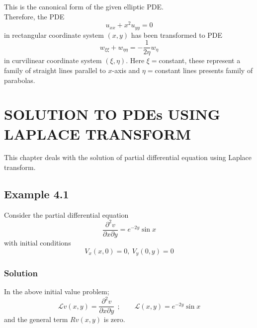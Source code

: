 \documentclass[11pt]{report}
\newcommand{\Laplace}{\mathcal{L}}
\newcommand{\sps}{\\[0.2cm]}
\begin{document}
	This is the canonical form of the given elliptic PDE.\sps
	Therefore, the PDE
	\begin{equation*}
		u_{xx} + x^2u_{yy} = 0
	\end{equation*}
	in rectangular coordinate system $(x,y)$ has been transformed to PDE
	\begin{equation*}
		w_{\xi\xi} + w_{\eta\eta} = - \frac{1}{2\eta}w_\eta
	\end{equation*}
	in curvilinear coordinate system $(\xi,\eta)$. Here $\xi=$constant, these represent a family of straight lines parallel to $x$-axis and $\eta=$constant lines presents family of parabolas.
	


	\chapter{SOLUTION TO PDEs USING LAPLACE TRANSFORM}
	This chapter deals with the solution of partial differential equation using Laplace transform.
	
	\section*{Example 4.1}
	Consider the partial differential equation
	\begin{equation*}
		\frac{\partial^2 v}{\partial x \partial y} = e^{-2y}\sin x \label{p:4_1_1} 
	\end{equation*}
	with initial conditions 
	\begin{equation*}
		V_x(x,0)=0, ~ V_y(0,y)=0 \label{p:4_1_2} 
	\end{equation*}

	\subsection*{Solution}	
	In the above initial value problem;
	\begin{equation*}
		\Laplace v(x,y) = \frac{\partial^2 v}{\partial x \partial y}~~;\qquad \Laplace(x,y)=e^{-2y}\sin x
	\end{equation*}
	and the general term $Rv(x,y)$ is zero.
	
\end{document}
